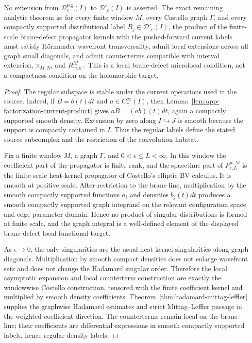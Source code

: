 \begin{prop}
  No extension from \(\mathcal D^{\mathrm{reg}}_c(I)\) to
  \(\mathcal D'_c(I)\) is asserted.  The exact remaining analytic theorem
  is: for every finite window \(M\), every Costello graph \(\Gamma\), and
  every compactly supported distributional label
  \(B_j\in\mathcal D'_c(I)\), the product of the finite-scale
  brane-defect propagator kernels with the pushed-forward current labels
  must satisfy H\"ormander wavefront transversality, admit local
  extensions across all graph small diagonals, and admit counterterms
  compatible with interval extension, \(\pi_{M,N}\), and \(R^M_{w,w'}\).
  This is a local brane-defect microlocal condition, not a compactness
  condition on the holomorphic target.
\end{prop}

\begin{proof}
  The regular subspace is stable under the current operations used in the
  source.  Indeed, if \(B=b(t)dt\) and \(a\in C^\infty_c(I)\), then
  Lemma~\ref{lem:app-factorization-current-product} gives
  \(aB=(ab)(t)dt\), again a compactly supported smooth density.  Extension
  by zero along \(I\hookrightarrow J\) is smooth because the support is
  compactly contained in \(I\).  Thus the regular labels define the stated
  source subcomplex and the restriction of the convolution habitat.

  Fix a finite window \(M\), a graph \(\Gamma\), and
  \(0<\epsilon\leq L<\infty\).  In this window the coefficient part of
  the propagator is finite rank, and the spacetime part of
  \(P_{\epsilon,L}^{w,M}\) is the finite-scale heat-kernel propagator of
  Costello's elliptic BV calculus.  It is smooth at positive scale.  After
  restriction to the brane line, multiplication by the smooth compactly
  supported functions \(a_i\) and densities \(b_j(t)dt\) produces a smooth
  compactly supported graph integrand on the relevant configuration space
  and edge-parameter domain.  Hence no product of singular distributions is
  formed at finite scale, and the graph integral is a well-defined element
  of the displayed brane-defect local-functional target.

  As \(\epsilon\to0\), the only singularities are the usual heat-kernel
  singularities along graph diagonals.  Multiplication by smooth compact
  densities does not enlarge wavefront sets and does not change the
  Hadamard singular order.  Therefore the local asymptotic expansion and
  local counterterm construction are exactly the windowwise Costello
  construction, tensored with the finite coefficient kernel and multiplied
  by smooth density coefficients.  Theorem~\ref{thm:hadamard-mittag-leffler}
  supplies the graphwise Hadamard estimates and strict Mittag--Leffler
  passage in the weighted coefficient direction.  The counterterms remain
  local on the brane line; their coefficients are differential expressions
  in smooth compactly supported labels, hence regular density labels.


\end{proof}
